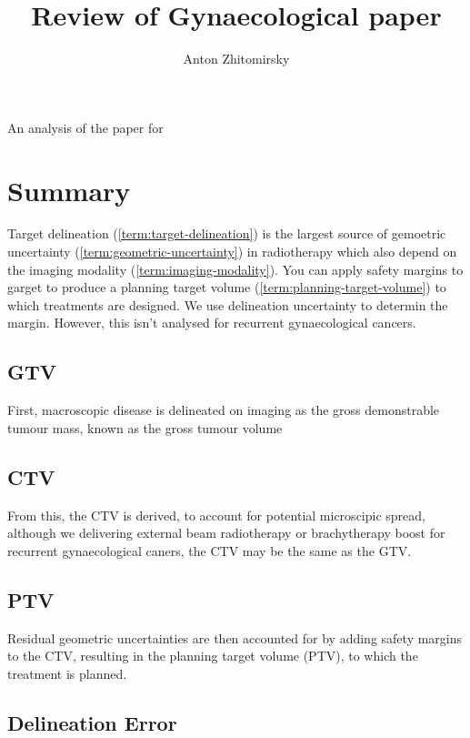 \documentclass[11pt]{article}
\title{Review of Gynaecological paper}
\author{Anton Zhitomirsky}
\begin{document}
\maketitle

An analysis of the paper for \cite{radiotehrapy-planning-gynaecological-cancer}

\section{Summary}

Target delineation (\ref{term:target-delineation}) is the largest source of gemoetric uncertainty (\ref{term:geometric-uncertainty}) in radiotherapy which also depend on the imaging modality (\ref{term:imaging-modality}). You can apply safety margins to garget to produce a planning target volume (\ref{term:planning-target-volume}) to which treatments are designed. We use delineation uncertainty to determin the margin. However, this isn't analysed for recurrent gynaecological cancers.

\subsection{GTV}

First, macroscopic disease is delineated on imaging as the gross demonstrable tumour mass, known as the gross tumour volume

\subsection{CTV}

From this, the CTV is derived, to account for potential microscipic spread, although we delivering external beam radiotherapy or brachytherapy boost for recurrent gynaecological caners, the CTV may be the same as the GTV.

\subsection{PTV}

Residual geometric uncertainties are then accounted for by
adding safety margins to the CTV, resulting in the planning
target volume (PTV), to which the treatment is planned.

\subsection{Delineation Error}
\end{document}
